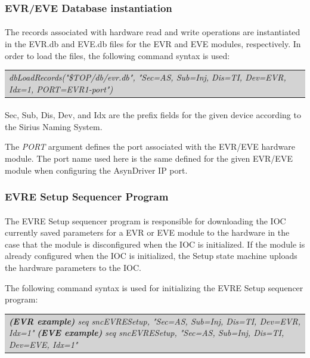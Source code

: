\documentclass[openany]{article}
\begin{document}
		\subsubsection{EVR/EVE Database instantiation}

			\paragraph{} The records associated with hardware read and write operations are instantiated in the EVR.db and EVE.db files for the EVR and EVE modules, respectively. In order to load the files, the following command syntax is used:

			\bigskip
			\colorbox{lightgray}{
				\begin{tabularx}{0.9\textwidth}{X}
				\emph{dbLoadRecords("\${TOP}/db/evr.db", "Sec=AS, Sub=Inj, Dis=TI, Dev=EVR, Idx=1, PORT=EVR1-port")}
				\end{tabularx}
			}


			\paragraph{} Sec, Sub, Dis, Dev, and Idx are the prefix fields for the given device according to the Sirius Naming System.
			\par The \emph{PORT} argument defines the port associated with the EVR/EVE hardware module. The port name used here is the same defined for the given EVR/EVE module when configuring the AsynDriver IP port.

		\subsubsection{EVRE Setup Sequencer Program}

			\paragraph{} The EVRE Setup sequencer program is responsible for downloading the IOC currently saved parameters for a EVR or EVE module to the hardware in the case that the module is disconfigured when the IOC is initialized. If the module is already configured when the IOC is initialized, the Setup state machine uploads the hardware parameters to the IOC.
			\par The following command syntax is used for initializing the EVRE Setup sequencer program:

			\bigskip
			\colorbox{lightgray}{
				\begin{tabularx}{0.9\textwidth}{X}
				\emph{{\bfseries(EVR example)} seq sncEVRESetup, "Sec=AS, Sub=Inj, Dis=TI, Dev=EVR, Idx=1"}
				\emph{{\bfseries(EVE example)} seq sncEVRESetup, "Sec=AS, Sub=Inj, Dis=TI, Dev=EVE, Idx=1"}
				\end{tabularx}
			}
\end{document}
